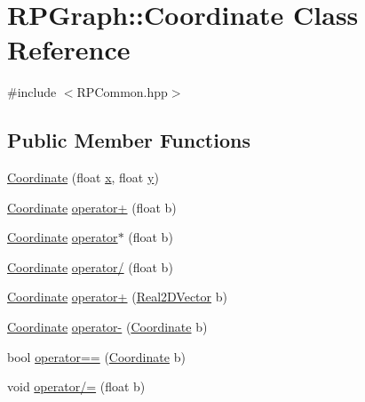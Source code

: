 \hypertarget{classRPGraph_1_1Coordinate}{}\section{R\+P\+Graph\+:\+:Coordinate Class Reference}
\label{classRPGraph_1_1Coordinate}


{\ttfamily \#include $<$R\+P\+Common.\+hpp$>$}

\subsection*{Public Member Functions}
\begin{DoxyCompactItemize}
\item 
\mbox{\hyperlink{classRPGraph_1_1Coordinate_a6d1ffc03b2cb43af855f8db7cddf6ad9}{Coordinate}} (float \mbox{\hyperlink{classRPGraph_1_1Coordinate_abbb78e1ac79af2c54785565f995e5d9d}{x}}, float \mbox{\hyperlink{classRPGraph_1_1Coordinate_a595c47428a7ce4b3172d0372e20c6818}{y}})
\item 
\mbox{\hyperlink{classRPGraph_1_1Coordinate}{Coordinate}} \mbox{\hyperlink{classRPGraph_1_1Coordinate_a95f57a593f9dbaa1c55069aa2ae940e9}{operator+}} (float b)
\item 
\mbox{\hyperlink{classRPGraph_1_1Coordinate}{Coordinate}} \mbox{\hyperlink{classRPGraph_1_1Coordinate_aa4f5c25b3bd2bf72c767c24007c57ca7}{operator$\ast$}} (float b)
\item 
\mbox{\hyperlink{classRPGraph_1_1Coordinate}{Coordinate}} \mbox{\hyperlink{classRPGraph_1_1Coordinate_a34518e1725653476215a505fca5bca4d}{operator/}} (float b)
\item 
\mbox{\hyperlink{classRPGraph_1_1Coordinate}{Coordinate}} \mbox{\hyperlink{classRPGraph_1_1Coordinate_a9efb7d87add55df9a8e25620b06e33ce}{operator+}} (\mbox{\hyperlink{classRPGraph_1_1Real2DVector}{Real2\+D\+Vector}} b)
\item 
\mbox{\hyperlink{classRPGraph_1_1Coordinate}{Coordinate}} \mbox{\hyperlink{classRPGraph_1_1Coordinate_a821567a6f0cc98f7baed00130559f284}{operator-\/}} (\mbox{\hyperlink{classRPGraph_1_1Coordinate}{Coordinate}} b)
\item 
bool \mbox{\hyperlink{classRPGraph_1_1Coordinate_af680710f64904e4f180309b6f99b904d}{operator==}} (\mbox{\hyperlink{classRPGraph_1_1Coordinate}{Coordinate}} b)
\item 
void \mbox{\hyperlink{classRPGraph_1_1Coordinate_a9127d5cc6c1dd17db1da49492ffd4fa8}{operator/=}} (float b)
\item 

\end{DoxyCompactItemize}
